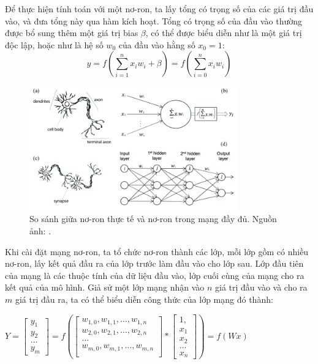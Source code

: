 \documentclass[12pt]{extreport}
\begin{document}
Để thực hiện tính toán với một nơ-ron, ta lấy tổng có trọng số của các giá trị đầu vào, và đưa tổng này qua hàm kích hoạt. Tổng có trọng số của đầu vào thường được bổ sung thêm một giá trị bias $ \beta $, có thể được biểu diễn như là một giá trị độc lập, hoặc như là hệ số $ w_0 $ của đầu vào hằng số $ x_0 = 1 $:
$$ y = f\left(\sum_{i=1}^{n} x_i w_i + \beta\right) = f\left(\sum_{i=0}^{n} x_i w_i\right) $$

\begin{figure}[H]
    \centering
    \includegraphics[width=0.8\textwidth]{figure4}
    \caption{So sánh giữa nơ-ron thực tế và nơ-ron trong mạng đầy đủ. Nguồn ảnh: \cite{article}.}
\end{figure}

Khi cài đặt mạng nơ-ron, ta tổ chức nơ-ron thành các lớp, mỗi lớp gồm có nhiều nơ-ron, lấy kết quả đầu ra của lớp trước làm đầu vào cho lớp sau. Lớp đầu tiên của mạng là các thuộc tính của dữ liệu đầu vào, lớp cuối cùng của mạng cho ra kết quả của mô hình. Giả sử một lớp mạng nhận vào $ n $ giá trị đầu vào và cho ra $ m $ giá trị đầu ra, ta có thể biểu diễn công thức của lớp mạng đó thành:

\begin{center}
    \begin{math}
        Y = \begin{bmatrix}
            y_1 \\
            y_2 \\
            ... \\
            y_m
        \end{bmatrix} = f \left(\begin{bmatrix}
                w_{1,0}, w_{1,1}, \dots, w_{1,n} \\
                w_{2,0}, w_{2,1}, \dots, w_{2,n} \\
                \dots                            \\
                w_{m,0}, w_{m,1}, \dots, w_{m,n} \\
            \end{bmatrix} * \begin{bmatrix}
                1,  \\
                x_1 \\
                x_2 \\
                ... \\
                x_n
            \end{bmatrix} \right) = f(Wx)
    \end{math}
\end{center}
\end{document}
